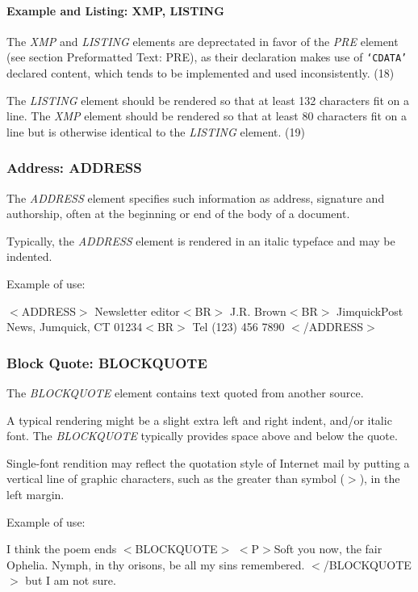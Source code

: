 \paragraph*{Example and Listing:  XMP, LISTING}\par 
The {\it XMP} and {\it LISTING} elements are deprectated in favor
of the {\it PRE} element (see section Preformatted Text:  PRE), as their declaration
makes use of {\tt `CDATA'} declared content, which tends to be
implemented and used inconsistently.
(18)\par \par 
The {\it LISTING} element should be rendered so that at least 132
characters fit on a line.  The {\it XMP} element should be rendered so
that at least 80 characters fit on a line but is otherwise identical
to the {\it LISTING} element.
(19)\par \subsubsection*{Address:  ADDRESS}\par 
The {\it ADDRESS} element specifies such information as address,
signature and authorship, often at the beginning or end of the body of
a document.
\par \par 
Typically, the {\it ADDRESS} element is rendered in an italic
typeface and may be indented.
\par \par 
Example of use:
\par $<$ADDRESS$>$
Newsletter editor$<$BR$>$
J.R. Brown$<$BR$>$
JimquickPost News, Jumquick, CT 01234$<$BR$>$
Tel (123) 456 7890
$<$/ADDRESS$>$
\subsubsection*{Block Quote:  BLOCKQUOTE}\par 
The {\it BLOCKQUOTE} element contains text quoted from another
source.
\par \par 
A typical rendering might be a slight extra left and right indent,
and/or italic font.  The {\it BLOCKQUOTE} typically provides space
above and below the quote.
\par \par 
Single-font rendition may reflect the quotation style of Internet
mail by putting a vertical line of graphic characters, such as the
greater than symbol ($>$), in the left margin.
\par \par 
Example of use:
\par I think the poem ends
$<$BLOCKQUOTE$>$
$<$P$>$Soft you now, the fair Ophelia. Nymph, in thy orisons, be all 
my sins remembered.
$<$/BLOCKQUOTE$>$
but I am not sure.
